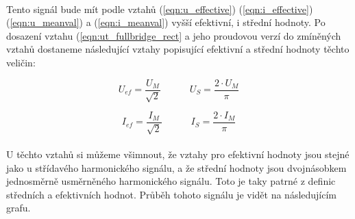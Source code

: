 \documentclass{praktikum}
\begin{document}
\paragraph{}
Tento signál bude mít podle vztahů (\ref{eqn:u_effective}) (\ref{eqn:i_effective}) (\ref{eqn:u_meanval}) a (\ref{eqn:i_meanval}) vyšší efektivní, i střední hodnoty. Po dosazení vztahu (\ref{eqn:ut_fullbridge_rect} a jeho proudovou verzí do zmíněných vztahů dostaneme následující vztahy popisující efektivní a střední hodnoty těchto veličin:

\begin{equation}
\label{eqn:u_eff_mean_fullbridge_rect}
U_{ef} = \frac{U_M}{\sqrt{2}} \quad \quad \quad
U_S = \frac{2\cdot U_M}{\pi}
\end{equation}

\begin{equation}
\label{eqn:i_eff_mean_fullbridge_rect}
I_{ef} = \frac{I_M}{\sqrt{2}} \quad \quad \quad
I_S = \frac{2\cdot I_M}{\pi}
\end{equation}

\paragraph{}
U těchto vztahů si můžeme všimnout, že vztahy pro efektivní hodnoty jsou stejné jako u střídavého harmonického signálu, a že střední hodnoty jsou dvojnásobkem jednosměrně usměrněného harmonického signálu. Toto je taky patrné z definic středních a efektivních hodnot. Průběh tohoto signálu je vidět na následujícím grafu.

\begin{center}
\end{center}
\end{document}
